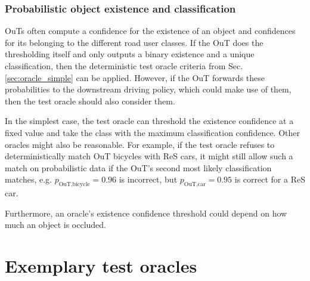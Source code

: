 \documentclass[conference]{IEEEtran}
\begin{document}
\subsubsection{Probabilistic object existence and classification}
\label{sec:prob_thresholding}

OuTs often compute a confidence for the existence of an object and confidences for its belonging to the different road user classes.
If the OuT does the thresholding itself and only outputs a binary existence and a unique classification, then the deterministic test oracle criteria from Sec. \ref{sec:oracle_simple} can be applied. 
However, if the OuT forwards these probabilities to the downstream driving policy, which could make use of them, then the test oracle should also consider them. 

In the simplest case, the test oracle can threshold the existence confidence at a fixed value and take the class with the maximum classification confidence.
Other oracles might also be reasonable.
For example, if the test oracle refuses to deterministically match OuT bicycles with ReS cars, it might still allow such a match on probabilistic data if the OuT's second most likely classification matches, e.g. $p_\text{OuT,bicycle} = 0.96$ is incorrect, but $p_\text{OuT,car} = 0.95$ is correct for a ReS car.

Furthermore, an oracle's existence confidence threshold could depend on how much an object is occluded. %




\section{Exemplary test oracles}
\label{sec:case_studies}

\end{document}
